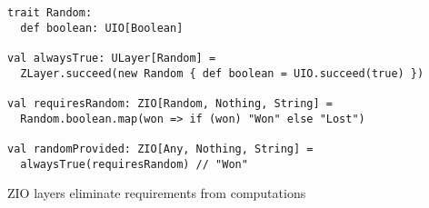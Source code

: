 \begin{algorithm}

\begin{verbatim}
trait Random:
  def boolean: UIO[Boolean]

val alwaysTrue: ULayer[Random] =
  ZLayer.succeed(new Random { def boolean = UIO.succeed(true) })

val requiresRandom: ZIO[Random, Nothing, String] =
  Random.boolean.map(won => if (won) "Won" else "Lost")

val randomProvided: ZIO[Any, Nothing, String] =
  alwaysTrue(requiresRandom) // "Won"

\end{verbatim}

\caption{ZIO layers eliminate requirements from computations \label{zio:provide-layer}}
\end{algorithm}